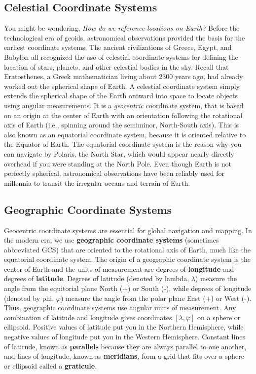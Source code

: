 \documentclass[
]{book}
\begin{document}
\hypertarget{celestial-coordinate-systems}{%
\subsection{Celestial Coordinate Systems}\label{celestial-coordinate-systems}}

You might be wondering, \emph{How do we reference locations on Earth?} Before the technological era of geoids, astronomical observations provided the basis for the earliest coordinate systems. The ancient civilizations of Greece, Egypt, and Babylon all recognized the use of celestial coordinate systems for defining the location of stars, planets, and other celestial bodies in the sky. Recall that Eratosthenes, a Greek mathematician living about 2300 years ago, had already worked out the spherical shape of Earth. A celestial coordinate system simply extends the spherical shape of the Earth outward into space to locate objects using angular measurements. It is a \emph{geocentric} coordinate system, that is based on an origin at the center of Earth with an orientation following the rotational axis of Earth (i.e., spinning around the semiminor, North-South axis). This is also known as an equatorial coordinate system, because it is oriented relative to the Equator of Earth. The equatorial coordinate system is the reason why you can navigate by Polaris, the North Star, which would appear nearly directly overhead if you were standing at the North Pole. Even though Earth is not perfectly spherical, astronomical observations have been reliably used for millennia to transit the irregular oceans and terrain of Earth.

\hypertarget{geographic-coordinate-systems}{%
\subsection{Geographic Coordinate Systems}\label{geographic-coordinate-systems}}

Geocentric coordinate systems are essential for global navigation and mapping. In the modern era, we use \textbf{geographic coordinate systems} (sometimes abbreviated GCS) that are oriented to the rotational axis of Earth, much like the equatorial coordinate system. The origin of a geographic coordinate system is the center of Earth and the units of measurement are degrees of \textbf{longitude} and degrees of \textbf{latitude}. Degrees of latitude (denoted by lambda, \(λ\)) measure the angle from the equitorial plane North (+) or South (-), while degrees of longitude (denoted by phi, \(φ\)) measure the angle from the polar plane East (+) or West (-). Thus, geographic coordinate systems use angular units of measurement. Any combination of latitude and longitude gives coordinates \([λ,φ]\) on a sphere or ellipsoid. Positive values of latitude put you in the Northern Hemisphere, while negative values of longitude put you in the Western Hemisphere. Constant lines of latitude, known as \textbf{parallels} because they are always parallel to one another, and lines of longitude, known as \textbf{meridians}, form a grid that fits over a sphere or ellipsoid called a \textbf{graticule}.
\end{document}
